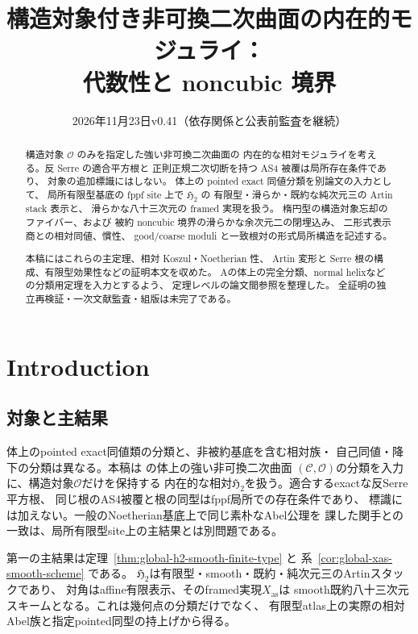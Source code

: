 \documentclass[a4paper,11pt]{ltjsarticle}
\title{構造対象付き非可換二次曲面の内在的モジュライ：\\代数性と noncubic 境界}
\author{}
\date{2026年11月23日\quad v0.41（依存関係と公表前監査を継続）}
\numberwithin{equation}{section}
\theoremstyle{plain}
\theoremstyle{definition}
\theoremstyle{remark}
\newcommand{\OO}{\mathcal O}
\newcommand{\HHstack}{\mathfrak H_2}
\begin{document}
\maketitle
\begin{abstract}
構造対象 $\mathcal O$ のみを指定した強い非可換二次曲面の
内在的な相対モジュライを考える。反 Serre の適合平方根と
正則正規二次切断を持つ AS4 被覆は局所存在条件であり、
対象の追加標識にはしない。
体上の pointed exact 同値分類を別論文の入力として、
局所有限型基底の fppf site 上で $\mathfrak H_2$ の
有限型・滑らか・既約な純次元三の Artin stack 表示と、
滑らかな八十三次元の framed 実現を扱う。
楕円型の構造対象忘却のファイバー、および
被約 noncubic 境界の滑らかな余次元二の閉埋込み、
二形式表示商との相対同値、慣性、
good/coarse moduli と一致根対の形式局所構造を記述する。

本稿にはこれらの主定理、相対 Koszul・Noetherian 性、
Artin 変形と Serre 根の構成、有限型効果性などの証明本文を収めた。
Aの体上の完全分類、normal helixなどの分類用定理を入力とするよう、
定理レベルの論文間参照を整理した。
全証明の独立再検証・一次文献監査・組版は未完了である。
\end{abstract}
\tableofcontents

\section{Introduction}\label{sec:moduli-intro}

\subsection{対象と主結果}
体上のpointed exact同値類の分類と、非被約基底を含む相対族・
自己同値・降下の分類は異なる。本稿は
\cite{QuadricIntrinsic2026} の体上の強い非可換二次曲面
$(\mathcal C,\OO)$の分類を入力に、構造対象$\OO$だけを保持する
内在的な相対$\HHstack$を扱う。適合するexactな反Serre平方根、
同じ根のAS4被覆と根の同型はfppf局所での存在条件であり、
標識には加えない。一般のNoetherian基底上で同じ素朴なAbel公理を
課した関手との一致は、局所有限型site上の主結果とは別問題である。

第一の主結果は定理~\ref{thm:global-h2-smooth-finite-type} と
系~\ref{cor:global-xas-smooth-scheme} である。
$\HHstack$は有限型・smooth・既約・純次元三のArtinスタックであり、
対角はaffine有限表示、そのframed実現$X_{\mathrm{as}}$は
smooth既約八十三次元スキームとなる。これは幾何点の分類だけでなく、
有限型atlas上の実際の相対Abel族と指定pointed同型の持上げから得る。
\end{document}
